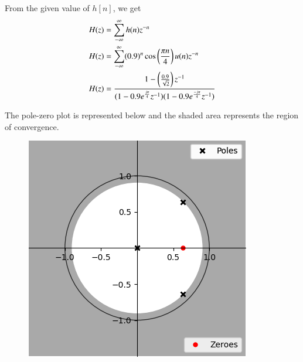 \documentclass[journal,12pt,twocolumn]{IEEEtran}
\begin{document}
From the given value of $h[n]$, we get
\begin{align}
    &H(z) = \sum_{-\infty}^{\infty} h(n)z^{-n} \\
    &H(z) = \sum_{-\infty}^{\infty} (0.9)^{n}\cos\left(\frac{\pi n}{4}\right) u(n) z^{-n} \\
    &H(z) = \frac{1 - \left(\frac{0.9}{\sqrt{2}}\right)z^{-1}}{(1 - 0.9 e^{\frac{j\pi}{4}} z^{-1})(1 - 0.9 e^{\frac{-j\pi}{4}} z^{-1})}
\end{align}

\vspace*{2mm}
The pole-zero plot is represented below and the shaded area represents the region of convergence.
\begin{figure}[h]
    \begin{center}
    \includegraphics[scale = 0.5]{figs/plot.png}
    \end{center}
\end{figure}
\end{document}
